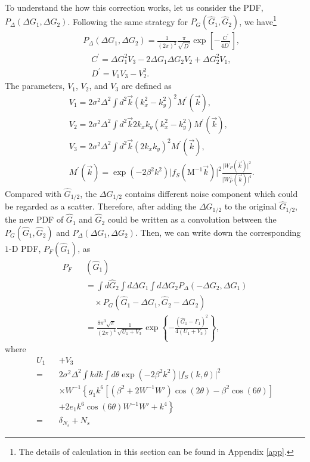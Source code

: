 \documentclass[twocolumn]{aastex62}
\begin{document}
To understand the how this correction works, let us consider the PDF, $P_{\Delta}(\Delta G_1,\Delta G_2)$. Following the same strategy for $P_G(\hat{G}_1,\hat{G}_2)$, we have\footnote{The details of calculation in this section can be found in Appendix \ref{app}.}
\begin{eqnarray}
&&P_{\Delta}\left(\Delta G_1,\Delta G_2\right)
=\frac{1}{(2\pi)^2}\frac{\pi}{\sqrt{D^\prime}}\exp\left[-\frac{C^\prime}{4D^\prime}\right], \\ \nonumber
&&\quad C^\prime = \Delta G_1^2V_3-2\Delta G_1\Delta G_2V_2+\Delta G_2^2V_1, \\ \nonumber
&&\quad D^\prime = V_1V_3-V_2^2.
\end{eqnarray}
The parameters, $V_1$, $V_2$, and $V_3$ are defined as
\begin{eqnarray}
&&V_1 = 2\sigma^2\Delta^2\int{d}^2\vec{k}\left(k_x^2-k_y^2\right)^2 M^\prime(\vec{k}),\\ \nonumber
&&V_2 = 2\sigma^2\Delta^2\int{d}^2\vec{k}2k_xk_y\left(k_x^2-k_y^2\right)M^\prime(\vec{k}),\\ \nonumber
&&V_3 = 2\sigma^2\Delta^2\int{d}^2\vec{k}(2k_xk_y)^2 M^\prime(\vec{k}),\\ \nonumber
&&M^\prime(\vec{k})=\exp(-2\beta^2k^2)\vert f_S(\mathrm{M}^{-1}\vec{k})\vert^2\frac{\vert W_{P}(\vec{k})\vert^2}{\vert W_{P}^{\perp}(\vec{k})\vert^4}.
\end{eqnarray}
Compared with $\hat{G}_{1/2}$, the $\Delta G_{1/2}$ contains different noise component which could be regarded as a scatter. Therefore, after adding the $\Delta G_{1/2}$ to the original $\hat{G}_{1/2}$, the new PDF of $\hat{G}_1$ and $\hat{G}_2$ could be written as a convolution between the $P_G(\hat{G}_1,\hat{G}_2)$ and $P_{\Delta}(\Delta G_1,\Delta G_2)$. Then, we can write down the corresponding $1$-D PDF, $P_F(\hat{G}_1)$, as
\begin{eqnarray}
P_F&&(\hat{G}_1)\\ \nonumber
&&=\int d\hat{G}_2\int d\Delta G_1\int d\Delta G_2  P_{\Delta}(-\Delta G_2,\Delta G_1)\\ \nonumber 
&&\quad \times P_G(\hat{G}_1-\Delta G_1,\hat{G}_2-\Delta G_2)\\ \nonumber
&&=\frac{8\pi^3\sqrt{\pi}}{(2\pi)^4}\frac{1}{\sqrt{U_1+V_3}}\exp\left\{-\frac{(\hat{G}_1-\Gamma_1)^2}{4(U_1+V_3)}\right\},
\end{eqnarray}
where
\begin{eqnarray}
U_1&& + V_3\\ \nonumber
=&&2\sigma^2\Delta^2\int kdk\int d\theta\exp(-2\beta^2k^2)\vert f_S(k,\theta)\vert^2\\ \nonumber
&&\times W^{-1}\left\{{g_1k^6[(\beta^2+2W^{-1}W')\cos(2\theta)-\beta^2\cos(6\theta)]}\right.\\ \nonumber
&&\left.{+2e_1k^6\cos(6\theta)W^{-1}W'+k^4}\right\} \\ \nonumber
=&&\delta_{N_s}+N_s
\end{eqnarray}
\end{document}
